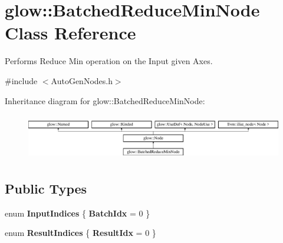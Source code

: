 \hypertarget{classglow_1_1_batched_reduce_min_node}{}\section{glow\+:\+:Batched\+Reduce\+Min\+Node Class Reference}
\label{classglow_1_1_batched_reduce_min_node}


Performs Reduce Min operation on the Input given Axes.  




{\ttfamily \#include $<$Auto\+Gen\+Nodes.\+h$>$}

Inheritance diagram for glow\+:\+:Batched\+Reduce\+Min\+Node\+:\begin{figure}[H]
\begin{center}
\leavevmode
\includegraphics[height=2.028986cm]{classglow_1_1_batched_reduce_min_node}
\end{center}
\end{figure}
\subsection*{Public Types}
\begin{DoxyCompactItemize}
\item 
\mbox{\label{classglow_1_1_batched_reduce_min_node_a078babff43d7a4915edbe6f02a54ffad}} 
enum {\bfseries Input\+Indices} \{ {\bfseries Batch\+Idx} = 0
 \}
\item 
\mbox{\label{classglow_1_1_batched_reduce_min_node_a10d271b9b8d7ef8e908bfc115171ad9c}} 
enum {\bfseries Result\+Indices} \{ {\bfseries Result\+Idx} = 0
 \}
\end{DoxyCompactItemize}
